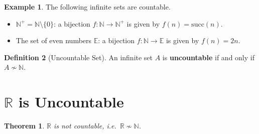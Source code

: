 \documentclass[12pt]{article}
\theoremstyle{definition}
\newtheorem{definition}{Definition}[section]
\newtheorem{example}[definition]{Example}
\theoremstyle{plain}
\newtheorem{theorem}{Theorem}[section]
\theoremstyle{remark}
\newcommand{\N}{\mathbb{N}}
\newcommand{\R}{\mathbb{R}}
\begin{document}
\begin{example}
The following infinite sets are countable.
\begin{itemize}[nosep]
    \item $\N^{+} = \N \setminus \{0\}$: a bijection $f\colon \N \to \N^{+}$ is given by
          $f(n)=\mathrm{succ}(n)$.
    \item The set of even numbers $\mathbb{E}$: a bijection $f\colon \N \to \mathbb{E}$ is given by
          $f(n)=2n$.
\end{itemize}
\end{example}

\begin{definition}[Uncountable Set]
An infinite set $A$ is \textbf{uncountable} if and only if $A \not\sim \N$.
\end{definition}

\section{\texorpdfstring{$\R$}{R} is Uncountable}

\begin{theorem}
$\R$ is not countable, i.e.\ $\R \not\sim \N$.
\end{theorem}
\end{document}
